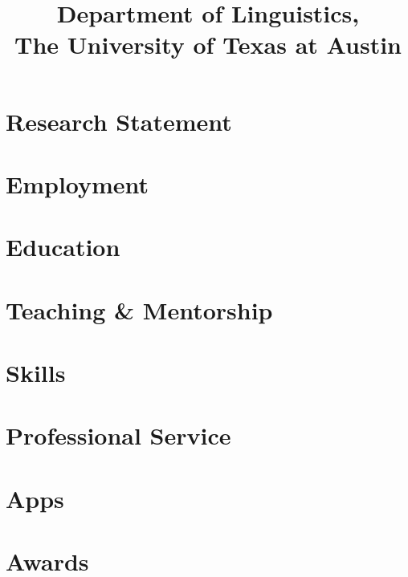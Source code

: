\documentclass[11pt, letterpaper]{practical-cv}
\title{Department of Linguistics,\\The University of Texas at Austin}
\begin{document}
\makecvtitle

\section{Research Statement}


\section{Employment}


\section{Education}


\printbibliography[title=Peer-Reviewed Publications, nottype=misc]

\setlength\bibitemsep{0.5em}
\printbibliography[title=Talks, type=misc, resetnumbers=true]

\section{Teaching \& Mentorship}


\section{Skills}


\section{Professional Service}


\section{Apps}


\section{Awards}

\end{document}
